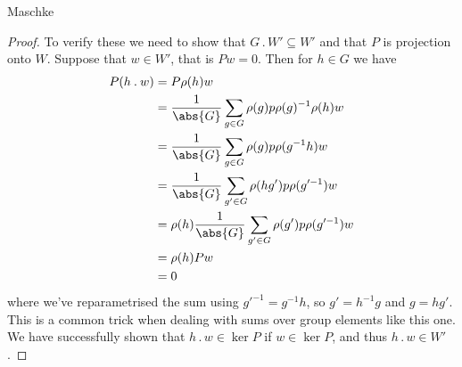 \documentclass[fleqn]{NotesClass}
\newcommand{\action}{\mathbin{.}}
\begin{document}
\begin{thm}{Maschke}{}
\begin{proof}
            To verify these we need to show that \(G \action W' \subseteq W'\) and that \(P\) is projection onto \(W\).
            Suppose that \(w \in W'\), that is \(Pw = 0\).
            Then for \(h \in G\) we have
            \begin{align}
                P(h \action w) &= P\rho(h)w\\
                &= \frac{1}{\abs{G}} \sum_{g \in G} \rho(g) p \rho(g)^{-1}\rho(h)w\\
                &= \frac{1}{\abs{G}} \sum_{g \in G} \rho(g) p \rho(g^{-1}h) w\\
                &= \frac{1}{\abs{G}} \sum_{g' \in G} \rho(hg') p \rho(g'^{-1}) w\\
                &= \rho(h) \frac{1}{\abs{G}} \sum_{g' \in G} \rho(g') p \rho(g'^{-1}) w\\
                &= \rho(h) P w\\
                &= 0
            \end{align}
            where we've reparametrised the sum using \(g'^{-1} = g^{-1}h\), so \(g' = h^{-1} g\) and \(g = hg'\).
            This is a common trick when dealing with sums over group elements like this one.
            We have successfully shown that \(h \action w \in \ker P\) if \(w \in \ker P\), and thus \(h \action w \in W'\).
            

\end{proof}
\end{thm}
\end{document}
